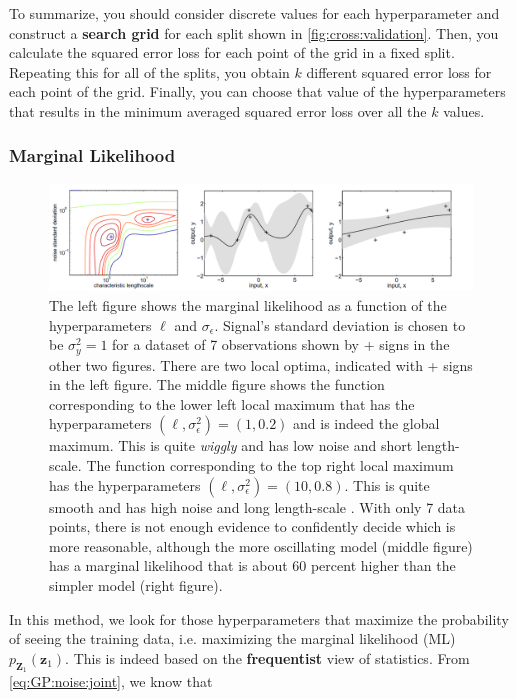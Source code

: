 \documentclass[10pt]{article}
\theoremstyle{definition}
\theoremstyle{definition}
\theoremstyle{remark}
\begin{document}
To summarize, you should consider discrete values for each hyperparameter and construct a \textbf{search grid} for each split shown in \cref{fig:cross:validation}. Then, you calculate the squared error loss for each point of the grid in a fixed split. Repeating this for all of the splits, you obtain $k$ different squared error loss for each point of the grid. Finally, you can choose that value of the hyperparameters that results in the minimum averaged squared error loss over all the $k$ values.

\subsubsection{Marginal Likelihood}
\begin{figure}[t!]
\centering
\includegraphics[width=17cm]{figs/marginal-likelihood.png}
\caption{The left figure shows the marginal likelihood as a function of the hyperparameters $\ell$ and $\sigma_{\epsilon}$. Signal's standard
deviation is chosen to be $\sigma_y^2 = 1$ for a dataset of 7 observations shown by + signs in the other two figures. There are two local optima, indicated with + signs in the left figure. The middle figure shows the function corresponding to the lower left local maximum that has the hyperparameters $(\ell, \sigma_{\epsilon}^2)=(1, 0.2)$ and is indeed the global maximum. This is quite \textit{wiggly} and has low noise and short length-scale. The function corresponding to the top right local maximum has the hyperparameters $(\ell, \sigma_{\epsilon}^2)=(10, 0.8)$. This is quite smooth and has high noise and long length-scale \cite[Section 5.4.1]{Rasmussen2006}. With only 7 data points, there is not enough evidence to confidently decide which is more reasonable, although the more oscillating model (middle figure) has a marginal likelihood that is about 60 percent higher than the simpler model (right figure)\cite[Section 15.2.4]{Murphy2012}.}
\label{fig:marginal:likelihood}
\end{figure}
In this method, we look for those hyperparameters that maximize the probability of seeing the training data, i.e. maximizing the marginal likelihood (ML) $p_{\mathbf{Z}_1}(\mathbf{z}_1)$. This is indeed based on the \textbf{frequentist} view of statistics. From \eqref{eq:GP:noise:joint}, we know that
\end{document}

